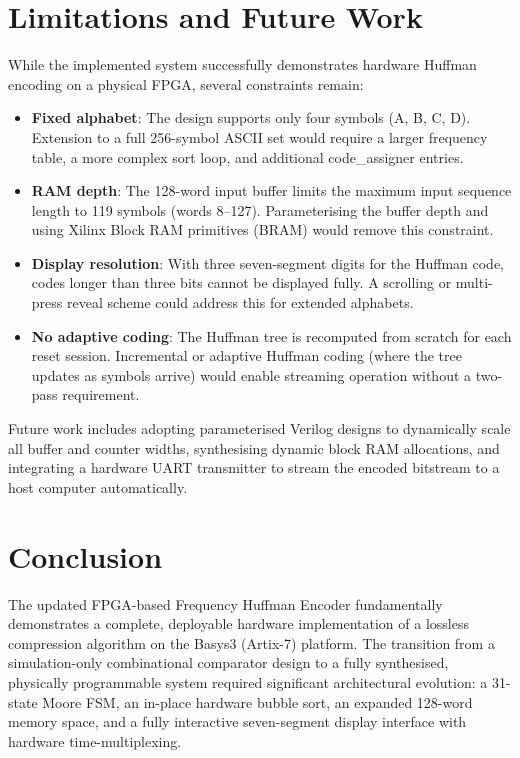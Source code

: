 \documentclass[12pt,a4paper]{article}
\begin{document}
\section{Limitations and Future Work}

While the implemented system successfully demonstrates hardware Huffman encoding on a
physical FPGA, several constraints remain:

\begin{itemize}
  \item \textbf{Fixed alphabet}: The design supports only four symbols (A, B, C, D).
        Extension to a full 256-symbol ASCII set would require a larger frequency table,
        a more complex sort loop, and additional code\_assigner entries.
  \item \textbf{RAM depth}: The 128-word input buffer limits the maximum input sequence
        length to 119 symbols (words 8--127). Parameterising the buffer depth and using
        Xilinx Block RAM primitives (BRAM) would remove this constraint.
  \item \textbf{Display resolution}: With three seven-segment digits for the Huffman
        code, codes longer than three bits cannot be displayed fully. A scrolling or
        multi-press reveal scheme could address this for extended alphabets.
  \item \textbf{No adaptive coding}: The Huffman tree is recomputed from scratch for
        each reset session. Incremental or adaptive Huffman coding (where the tree
        updates as symbols arrive) would enable streaming operation without a two-pass
        requirement.
\end{itemize}

Future work includes adopting parameterised Verilog designs to dynamically scale all
buffer and counter widths, synthesising dynamic block RAM allocations, and integrating
a hardware UART transmitter to stream the encoded bitstream to a host computer
automatically.

\section{Conclusion}

The updated FPGA-based Frequency Huffman Encoder fundamentally demonstrates a complete,
deployable hardware implementation of a lossless compression algorithm on the Basys3
(Artix-7) platform. The transition from a simulation-only combinational comparator
design to a fully synthesised, physically programmable system required significant
architectural evolution: a 31-state Moore FSM, an in-place hardware bubble sort, an
expanded 128-word memory space, and a fully interactive seven-segment display interface
with hardware time-multiplexing.
\end{document}
